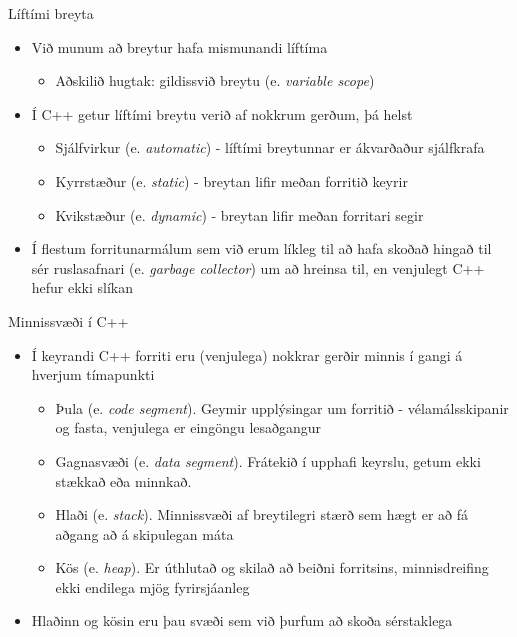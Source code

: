 \documentclass[handout]{beamer}
\begin{document}
\begin{frame}{Líftími breyta}
\begin{itemize}
 \item Við munum að breytur hafa mismunandi líftíma
 \begin{itemize}
  \item Aðskilið hugtak: gildissvið breytu (e. \emph{variable scope})
 \end{itemize}
 \item Í C++ getur líftími breytu verið af nokkrum gerðum, þá helst
 \begin{itemize}
  \item Sjálfvirkur (e. \emph{automatic}) - líftími breytunnar er ákvarðaður sjálfkrafa
  \item Kyrrstæður (e. \emph{static}) - breytan lifir meðan forritið keyrir
  \item Kvikstæður (e. \emph{dynamic}) - breytan lifir meðan forritari segir
 \end{itemize}
 \item Í flestum forritunarmálum sem við erum líkleg til að hafa skoðað hingað til sér ruslasafnari (e. \emph{garbage collector}) um að hreinsa til, en venjulegt C++ hefur ekki slíkan
\end{itemize}
\end{frame}

\begin{frame}{Minnissvæði í C++}
\begin{itemize}
 \item Í keyrandi C++ forriti eru (venjulega) nokkrar gerðir minnis í gangi á hverjum tímapunkti
 \begin{itemize}
  \item Þula (e. \emph{code segment}). Geymir upplýsingar um forritið - vélamálsskipanir og fasta, venjulega er eingöngu lesaðgangur
  \item Gagnasvæði (e. \emph{data segment}).
  Frátekið í upphafi keyrslu, getum ekki stækkað eða minnkað.
  \item Hlaði (e. \emph{stack}). Minnissvæði af breytilegri stærð sem hægt er að fá aðgang að á skipulegan máta
  \item Kös (e. \emph{heap}). Er úthlutað og skilað að beiðni forritsins, minnisdreifing ekki endilega mjög fyrirsjáanleg
 \end{itemize}
 \item Hlaðinn og kösin eru þau svæði sem við þurfum að skoða sérstaklega
\end{itemize}
\end{frame}
\end{document}
